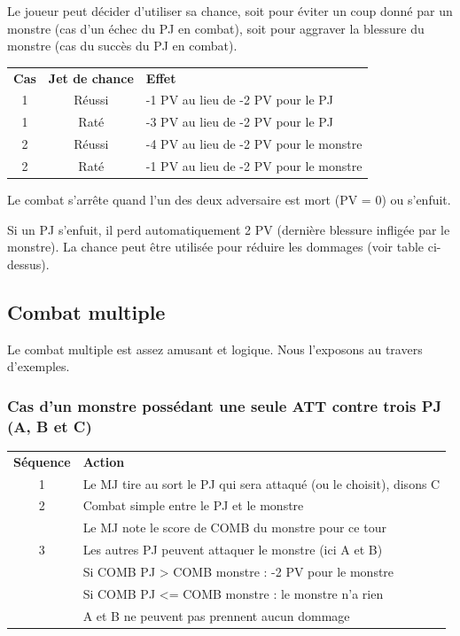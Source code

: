 \documentclass[a4paper, 11pt, twoside]{article}
\begin{document}
Le joueur peut décider d'utiliser sa chance, soit pour éviter un coup donné par un monstre (cas d'un échec du PJ en combat), soit pour aggraver la blessure du monstre (cas du succès du PJ en combat).

\begin{longtable}{ccl}
\textbf{Cas} & \textbf{Jet de chance} & \textbf{Effet}\\
1 & Réussi & -1 PV au lieu de -2 PV pour le PJ\\
1 & Raté & -3 PV au lieu de -2 PV pour le PJ\\
2 & Réussi & -4 PV au lieu de -2 PV pour le monstre\\
2 & Raté & -1 PV au lieu de -2 PV pour le monstre\\
\end{longtable}

Le combat s'arrête quand l'un des deux adversaire est mort (PV = 0) ou s'enfuit.

Si un PJ s'enfuit, il perd automatiquement 2 PV (dernière blessure infligée par le monstre). La chance peut être utilisée pour réduire les dommages (voir table ci-dessus).

\subsection{Combat multiple}
\label{sec:orga5c5734}

Le combat multiple est assez amusant et logique. Nous l'exposons au travers d'exemples.

\subsubsection{Cas d'un monstre possédant une seule ATT contre trois PJ (A, B et C)}
\label{sec:org2e64de1}

\begin{longtable}{cl}
\textbf{Séquence} & \textbf{Action}\\
1 & Le MJ tire au sort le PJ qui sera attaqué (ou le choisit), disons C\\
2 & Combat simple entre le PJ et le monstre\\
 & Le MJ note le score de COMB du monstre pour ce tour\\
3 & Les autres PJ peuvent attaquer le monstre (ici A et B)\\
 & Si COMB PJ > COMB monstre : -2 PV pour le monstre\\
 & Si COMB PJ <= COMB monstre : le monstre n'a rien\\
 & A et B ne peuvent pas prennent aucun dommage\\
\end{longtable}
\end{document}

